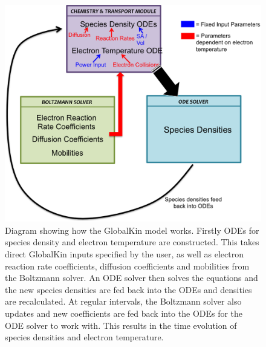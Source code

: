 \documentclass[11pt, oneside]{article}   	%
\begin{document}
\begin{figure}
\includegraphics[width=\textwidth]{Figures/GlobalKin}
\caption{Diagram showing how the GlobalKin model works. Firstly ODEs for species density and electron temperature are constructed. This takes direct GlobalKin inputs specified by the user, as well as electron reaction rate coefficients, diffusion coefficients and mobilities from the Boltzmann solver. An ODE solver then solves the equations and the new species densities are fed back into the ODEs and densities are recalculated. At regular intervals, the Boltzmann solver also updates and new coefficients are fed back into the ODEs for the ODE solver to work with. This results in the time evolution of species densities and electron temperature.}
\label{GlobalKinDiagram}
\end{figure}


\end{document}
